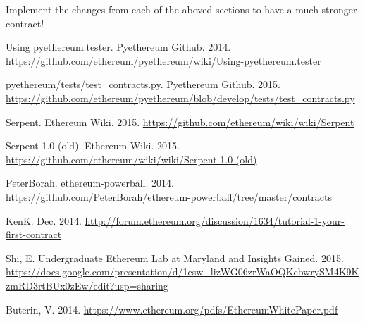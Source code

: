 \documentclass[12pt]{article}
\begin{document}
Implement the changes from each of the aboved sections to have a much stronger contract!


\begin{thebibliography}{9}

	Using pyethereum.tester. Pyethereum Github. 2014. \url{https://github.com/ethereum/pyethereum/wiki/Using-pyethereum.tester}

	pyethereum/tests/test\_contracts.py. Pyethereum Github. 2015. \url{https://github.com/ethereum/pyethereum/blob/develop/tests/test_contracts.py}

	Serpent. Ethereum Wiki. 2015. \url{https://github.com/ethereum/wiki/wiki/Serpent}

	Serpent 1.0 (old). Ethereum Wiki. 2015. \url{https://github.com/ethereum/wiki/wiki/Serpent-1.0-(old)}

	PeterBorah. ethereum-powerball. 2014. \url{https://github.com/PeterBorah/ethereum-powerball/tree/master/contracts}

	KenK. Dec. 2014. \url{http://forum.ethereum.org/discussion/1634/tutorial-1-your-first-contract}

	Shi, E. Undergraduate Ethereum Lab at Maryland and Insights Gained. 2015. \url{https://docs.google.com/presentation/d/1esw_lizWG06zrWaOQKcbwrySM4K9KzmRD3rtBUx0zEw/edit?usp=sharing}

	Buterin, V. 2014. \url{https://www.ethereum.org/pdfs/EthereumWhitePaper.pdf}

\end{thebibliography}
\end{document}
